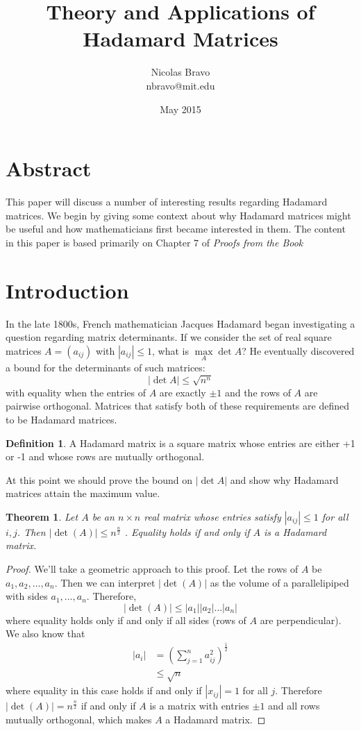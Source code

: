 \documentclass{article}
\title{Theory and Applications of  Hadamard Matrices}
\author{Nicolas Bravo \\ nbravo@mit.edu }
\date{May 2015}
\newtheorem{theorem}{Theorem}[section]
\theoremstyle{definition}
\newtheorem{definition}{Definition}[section]
\begin{document}
\maketitle

\section{Abstract}
This paper will discuss a number of interesting results regarding Hadamard matrices. We begin by giving some context about why Hadamard matrices might be useful and how mathematicians first became interested in them. The content in this paper is based primarily on Chapter 7 of \emph{Proofs from the Book}\cite{pftb}

\section{Introduction}
In the late 1800s, French mathematician Jacques Hadamard began investigating a question regarding matrix determinants. If we consider the set of real square matrices $A = (a_{ij})$ with $|a_{ij}| \leq 1$, what is $\underset{A}{\max} \det A$? He eventually discovered a bound for the determinants of such matrices:
$$ |\det A| \leq \sqrt{n^n} $$
with equality when the entries of $A$ are exactly $\pm 1$ and the rows of $A$ are pairwise orthogonal. Matrices that satisfy both of these requirements are defined to be Hadamard matrices.

\begin{definition}
 A Hadamard matrix is a square matrix whose entries are either +1 or -1 and whose rows are mutually orthogonal.
\end{definition}

At this point we should prove the bound on $|\det A|$ and show why Hadamard matrices attain the maximum value.
\begin{theorem}
Let $A$  be an $n \times n$ real matrix whose entries satisfy $| a_{ij} | \leq 1$ for all $i , j$.  Then $| \det ( A) | \leq n^{\frac n  2}$ .  Equality holds if and only if $A$ is a Hadamard matrix.
\end{theorem}

\begin{proof}
 We'll take a geometric approach to this proof. Let the rows of $A$ be $a_1, a_2, \ldots, a_n$. Then we can interpret $|\det(A)|$ as the volume of a parallelipiped with sides $a_1, \ldots, a_n$. Therefore,
 $$ |\det(A)| \leq |a_1||a_2| \ldots |a_n|$$
 where equality holds only if and only if all sides (rows of $A$ are perpendicular). We also know that
 \begin{align*}
 |a_i| &= \left( \sum_{j = 1}^n a_{ij}^2 \right)^{\frac 1 2} \\
 & \leq \sqrt n
 \end{align*}
 where equality in this case holds if and only if $|x_{ij}| = 1$ for all $j$. Therefore  $| \det ( A) | = n^{\frac n  2}$ if and only if $A$ is a matrix with entries $\pm 1$ and all rows mutually orthogonal, which makes $A$ a Hadamard matrix.
\end{proof}
\end{document}
